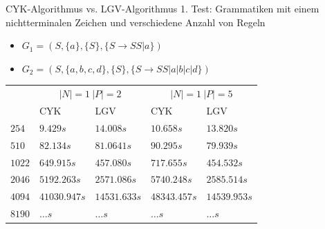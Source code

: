 \documentclass{beamer}
\begin{document}
	\begin{frame}{CYK-Algorithmus vs. LGV-Algorithmus}
		1. Test: Grammatiken mit einem nichtterminalen Zeichen und verschiedene Anzahl von Regeln
		\pause
		\begin{itemize}
			\item $G_1 = (S, \{a\}, \{S\}, \{S\to SS | a\})$
			\item $G_2 = (S, \{a,b,c,d\}, \{S\}, \{S\to SS | a | b | c |d\})$
		\end{itemize}
		\pause
		\begin{table}[H]
			\centering
			\begin{tabular}{|m{2cm}||m{1.7cm}|m{1.7cm}||m{1.7cm}|m{1.7cm}|} 
				\hline
				\multirow{2}{*}{\diagbox[width=\dimexpr \textwidth/8+4.5\tabcolsep\relax, height=1cm]{$|w|$}{$Grammatik$}}& \multicolumn{2}{c||}{$|N|=1 \ |P|=2$} & \multicolumn{2}{c|}{$|N|=1 \ |P|=5$}\\ [0.5ex] 
				\cline{2-5}
				& CYK & LGV & CYK & LGV\\
				\hline\hline
				$254$ & $9.429s$ & $14.008s$ &$10.658s$&$13.820s$\\[1ex]
				\hline
				$510$ & $82.134s$ & \cellcolor{lightgray}$81.0641s$ & $90.295s$&\cellcolor{lightgray}$79.939s$\\[1ex]
				\hline
				$1022$ & $649.915s$ & \cellcolor{green}$457.080s$ & $717.655s$&\cellcolor{green}$454.532s$\\[1ex]
				\hline
				$2046$ & $5192.263s$ & $2571.086s$ & $5740.248s$&$2585.514s$\\[1ex]
				\hline
				$4094$ & $41030.947s$ & $14531.633s$ & $48343.457s$&$14539.953s$\\[1ex]
				\hline
				$8190$ & $\ldots s$ & $\ldots s$ & $\ldots s$ & $\ldots s$ \\[1ex]
				\hline
			\end{tabular}
		\end{table}
	\end{frame}

	
	
\end{document}

